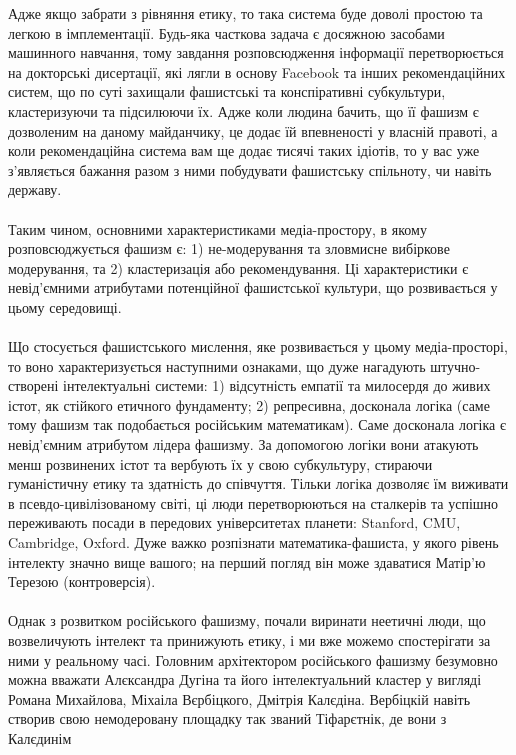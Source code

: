 Адже якщо забрати з рівняння етику, то така система буде доволі простою та легкою
в імплементації. Будь-яка часткова задача є досяжною засобами машинного навчання,
тому завдання розповсюдження інформації перетворюється на докторські дисертації,
які лягли в основу Facebook та інших рекомендаційних систем, що по суті захищали
фашистські та конспіративні субкультури, кластеризуючи та підсилюючи їх. Адже
коли людина бачить, що її фашизм є дозволеним на даному майданчику, це додає їй
впевненості у власній правоті, а коли рекомендаційна система вам ще додає тисячі
таких ідіотів, то у вас уже з'являється бажання разом з ними побудувати
фашистську спільноту, чи навіть державу.
\\
\\
Таким чином, основними характеристиками медіа-простору, в якому розповсюджується
фашизм є: 1) не-модерування та зловмисне вибіркове модерування, та 2) кластеризація
або рекомендування. Ці характеристики є невід'ємними атрибутами потенційної
фашистської культури, що розвивається у цьому середовищі.
\\
\\
Що стосується фашистського мислення, яке розвивається у цьому медіа-просторі,
то воно характеризується наступними ознаками, що дуже нагадують штучно-створені
інтелектуальні системи: 1) відсутність емпатії та милосердя до живих істот, як
стійкого етичного фундаменту; 2) репресивна, досконала логіка (саме тому фашизм
так подобається російським математикам). Саме досконала логіка є невід'ємним
атрибутом лідера фашизму. За допомогою логіки вони атакують менш розвинених
істот та вербують їх у свою субкультуру, стираючи гуманістичну етику та
здатність до співчуття. Тільки логіка дозволяє їм виживати в псевдо-цивілізованому
світі, ці люди перетворюються на сталкерів та успішно переживають посади в передових
університетах планети: Stanford, CMU, Cambridge, Oxford. Дуже важко розпізнати
математика-фашиста, у якого рівень інтелекту значно вище вашого; на перший
погляд він може здаватися Матір'ю Терезою (контроверсія).
\\
\\
Однак з розвитком російського фашизму, почали виринати неетичні люди, що
возвеличують інтелект та принижують етику, і ми вже можемо спостерігати
за ними у реальному часі. Головним архітектором російського фашизму безумовно
можна вважати Алєксандра Дугіна та його інтелектуальний кластер у вигляді
Романа Михайлова, Міхаіла Вєрбіцкого, Дмітрія Калєдіна. Вербіцкій навіть
створив свою немодеровану площадку так званий Тіфарєтнік, де вони з Калєдинім
